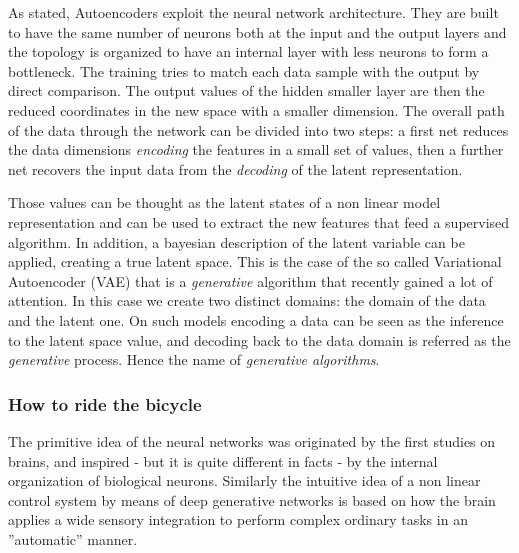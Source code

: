 As stated, Autoencoders exploit the neural network architecture. They are built to have the same number of neurons both at the input and the output layers and the topology is organized to have an internal layer with less neurons to form a bottleneck. The training tries to match each data sample with the output by direct comparison.
The output values of the hidden smaller layer are then the reduced coordinates in the new space with a smaller dimension.
The overall path of the data through the network can be divided into two steps: a first net reduces the data dimensions \textit{encoding} the features in a small set of values, then a further net recovers the input data from the \textit{decoding} of the latent representation. 

Those values can be thought as the latent states of a non linear model representation and can be used to extract the new features that feed a supervised algorithm. In addition, a bayesian description of the latent variable can be applied, creating a true latent space. This is the case of the so called Variational Autoencoder (VAE) that is a \textit{generative} algorithm that recently gained a lot of attention.
In this case we create two distinct domains: the domain of the data and the latent one. On such models encoding a data can be seen as the inference to the latent space value, and decoding back to the data domain is referred as the \textit{generative} process. Hence the name of \textit{generative algorithms}.




\subsubsection{How to ride the bicycle}

The primitive idea of the neural networks was originated by the first studies on brains, and inspired - but it is quite different in facts - by the internal organization of biological neurons. Similarly the intuitive idea of a non linear control system by means of deep generative networks is based on how the brain applies a wide sensory integration to perform complex ordinary tasks in an ”automatic” manner. 

